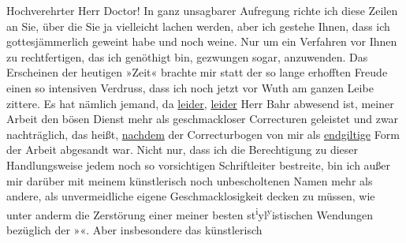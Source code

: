 \pstart\center{}Hochverehrter Herr Doctor!\pend\vspace{0.5em}
\pstart
           In ganz unsagbarer Aufregung richte ich diese Zeilen an Sie, über die Sie ja
               vielleicht lachen werden, aber ich gestehe Ihnen, dass ich gottesjämmerlich geweint
               habe und noch weine. Nur um ein Verfahren vor Ihnen zu rechtfertigen, das ich
               genöthigt bin, gezwungen sogar, anzuwenden. Das {\pb}Erscheinen der heutigen
                  »Zeit« brachte mir statt der so lange
               erhofften Freude einen so intensiven Verdruss, dass ich noch jetzt vor Wuth am ganzen
               Leibe zittere. Es hat nämlich jemand, da \uline{leider}, \uline{leider} Herr Bahr abwesend ist, meiner Arbeit den bösen Dienst mehr als geschmackloser Correcturen geleistet und
               zwar nachträglich, das heißt, \uline{nachdem} der
               Correcturbogen von mir als \uline{endgiltige} Form der Arbeit abgesandt war. Nicht
               nur, dass ich die Berech{\pb}tigung zu dieser Handlungsweise jedem noch so
               vorsichtigen Schriftleiter bestreite, bin ich außer mir darüber mit meinem
               künstlerisch noch unbescholtenen Namen mehr als andere, als unvermeidliche eigene
               Geschmacklosigkeit decken zu müssen, wie unter anderm die Zerstörung einer meiner
               besten st\substVorne{}\textsuperscript{i}\substDazwischen{}y\substHinten{}l\substVorne{}\textsuperscript{y}\substDazwischen{}i\substHinten{}stischen Wendungen bezüglich der »\label{K_L03697-1v}\label{K_L03697-1}«. Aber insbesondere das künstlerisch
